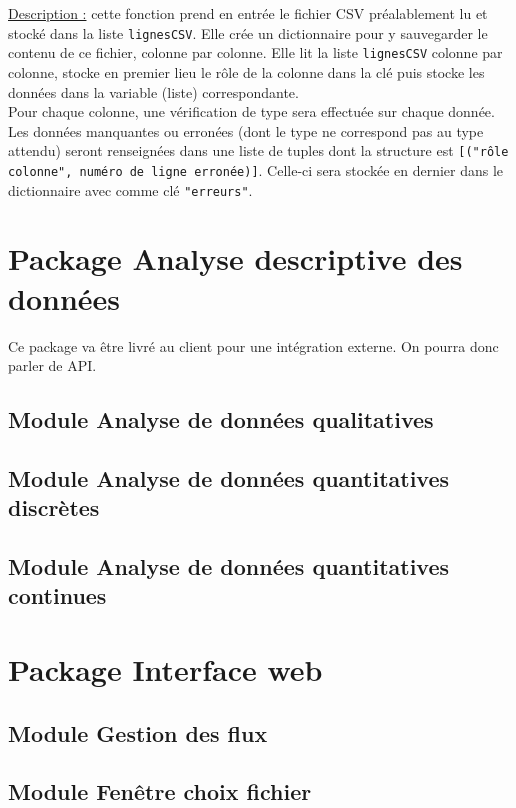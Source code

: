 \begin{enumerate}
					\underline{Description :} cette fonction prend en entrée le fichier CSV préalablement lu et stocké dans la liste \lstinline!lignesCSV!. Elle crée un dictionnaire pour y sauvegarder le contenu de ce fichier, colonne par colonne. Elle lit la liste \lstinline!lignesCSV! colonne par colonne, stocke en premier lieu le rôle de la colonne dans la clé puis stocke les données dans la variable (liste) correspondante. \\
					Pour chaque colonne, une vérification de type sera effectuée sur chaque donnée. Les données manquantes ou erronées (dont le type ne correspond pas au type attendu) seront renseignées dans une liste de tuples dont la structure est \lstinline![("rôle colonne", numéro de ligne erronée)]!. Celle-ci sera stockée en dernier dans le dictionnaire avec comme clé \lstinline!"erreurs"!.
			\end{enumerate}
	
	\section{Package Analyse descriptive des données}
	Ce package va être livré au client pour une intégration externe. On pourra donc parler de API.
	
		\subsection{Module Analyse de données qualitatives}
		
		\subsection{Module Analyse de données quantitatives discrètes}
			
		\subsection{Module Analyse de données quantitatives continues}
		
		
	\section{Package Interface web}
		
		\subsection{Module Gestion des flux}
		
		\subsection{Module Fenêtre choix fichier}
		
